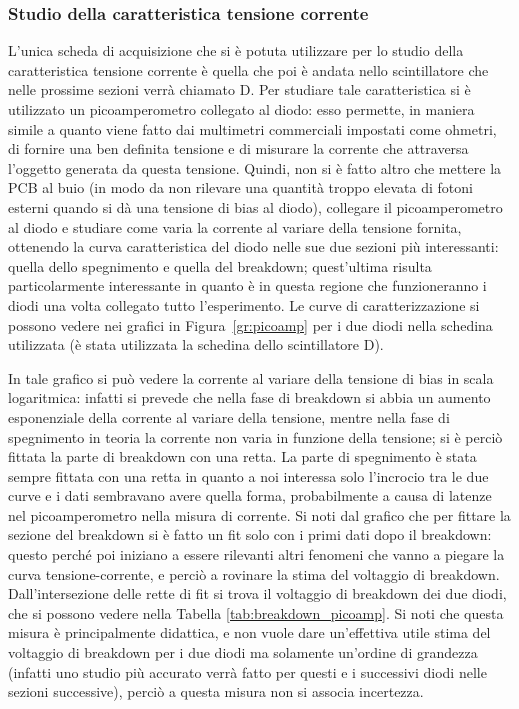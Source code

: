 \subsubsection{Studio della caratteristica tensione corrente}
L'unica scheda di acquisizione che si è potuta utilizzare per lo studio della caratteristica tensione corrente è quella che poi è andata nello scintillatore che nelle prossime sezioni verrà chiamato D. Per studiare tale caratteristica si è utilizzato un picoamperometro collegato al diodo: esso permette, in maniera simile a quanto viene fatto dai multimetri commerciali
impostati come ohmetri, di fornire una ben definita tensione e di misurare la corrente che attraversa l'oggetto generata da questa tensione. Quindi,
non si è fatto altro che mettere la PCB al buio (in modo da non rilevare una quantità troppo elevata di fotoni esterni quando si dà una tensione di bias al diodo),
collegare il picoamperometro al diodo e studiare come varia la corrente al variare della tensione fornita, ottenendo la curva caratteristica del diodo nelle sue due
sezioni più interessanti: quella dello spegnimento e quella del breakdown; quest'ultima risulta particolarmente interessante in quanto è in questa regione che funzioneranno
i diodi una volta collegato tutto l'esperimento. Le curve di caratterizzazione si possono vedere nei grafici in Figura~\ref{gr:picoamp} per i due  diodi nella schedina utilizzata (è stata utilizzata la schedina dello scintillatore D).

In tale grafico si può vedere la corrente al variare della tensione di bias in scala logaritmica: infatti si prevede che nella fase  di breakdown si abbia un aumento esponenziale della corrente al variare della tensione, mentre nella fase di spegnimento in teoria la corrente non varia in funzione della tensione; si \`e perci\`o fittata la parte di breakdown con una retta. La parte di spegnimento \`e stata sempre fittata con una retta in quanto a noi interessa solo l'incrocio tra le due curve e i dati sembravano avere quella forma, probabilmente a causa di latenze nel picoamperometro nella misura di corrente. Si noti dal grafico che per fittare la sezione del breakdown si è fatto un fit solo con i primi dati dopo il breakdown: questo perché poi iniziano a essere rilevanti altri fenomeni che vanno a piegare la curva tensione-corrente, e perciò a rovinare la stima del voltaggio di breakdown.
Dall'intersezione delle rette di fit si trova il voltaggio di breakdown dei due diodi, che si possono vedere nella Tabella \ref{tab:breakdown_picoamp}.
Si noti che questa misura è principalmente didattica, e non vuole dare un'effettiva utile stima del voltaggio di breakdown per i due diodi ma solamente un'ordine di grandezza
(infatti uno studio più accurato verrà fatto per questi e i successivi diodi nelle sezioni successive), perciò a questa misura non si associa incertezza.

